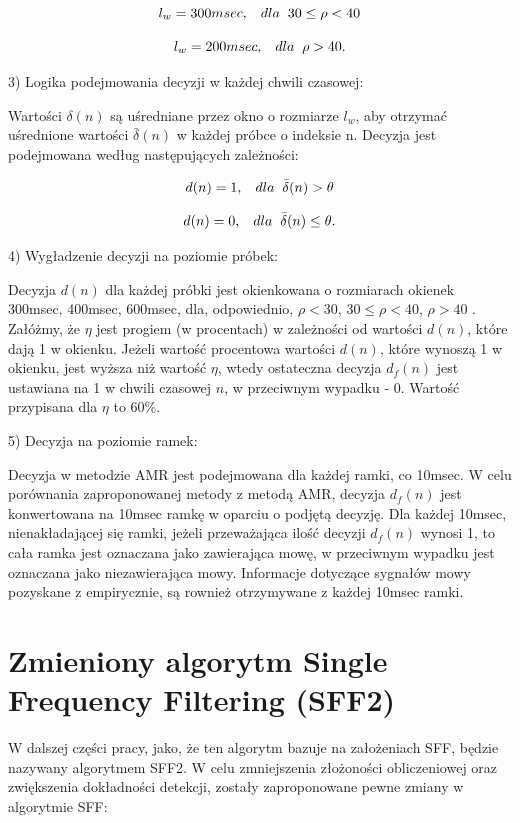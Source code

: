 \documentclass[eng,printmode]{mgr}
\begin{document}
  $$l_{w} = 300msec,\hspace{3mm}dla\hspace{2mm} 30\leq\rho<40 $$
  
  $$l_{w} = 200msec,\hspace{3mm}dla\hspace{2mm} \rho>40.$$\vspace{5mm}
  
  3) Logika podejmowania decyzji w każdej chwili czasowej:
  
  Wartości $\delta(n)$ są uśredniane przez okno o rozmiarze $l_{w}$, aby otrzymać uśrednione wartości $\bar{\delta}(n)$ w każdej próbce o indeksie n. Decyzja jest podejmowana według następujących zależności:
  
  $$d(n) = 1,\hspace{3mm}dla\hspace{2mm}\bar{\delta}(n)>\theta$$
  
  $$d(n) = 0,\hspace{3mm}dla\hspace{2mm}\bar{\delta}(n)\leq\theta.$$\vspace{5mm}
  
  4) Wygładzenie decyzji na poziomie próbek:
  
  Decyzja $d(n)$ dla każdej próbki jest okienkowana o rozmiarach okienek 300msec, 400msec, 600msec, dla, odpowiednio, $\rho<30$, $30\leq\rho<40$, $\rho>40$ . Załóżmy, że $\eta$ jest progiem (w procentach) w zależności od wartości $d(n)$, które dają 1 w okienku. Jeżeli wartość procentowa wartości $d(n)$, które wynoszą 1 w okienku, jest wyższa niż wartość $\eta$, wtedy ostateczna decyzja $d_f(n)$ jest ustawiana na 1 w chwili czasowej $n$, w przeciwnym wypadku - 0. Wartość przypisana dla $\eta$ to 60\%.\vspace{5mm}
  
  5) Decyzja na poziomie ramek:
  
  Decyzja w metodzie AMR jest podejmowana dla każdej ramki, co 10msec. W celu porównania zaproponowanej metody z metodą AMR, decyzja $d_{f}(n)$ jest konwertowana na 10msec ramkę w oparciu o podjętą decyzję. Dla każdej 10msec, nienakładającej się ramki, jeżeli przeważająca ilość decyzji $d_{f}(n)$ wynosi 1, to cała ramka jest oznaczana jako zawierająca mowę, w przeciwnym wypadku jest oznaczana jako niezawierająca mowy. Informacje dotyczące sygnałów mowy pozyskane z empirycznie, są rownież otrzymywane z każdej 10msec ramki.
  
  
 \newpage
 
\section{Zmieniony algorytm Single Frequency Filtering (SFF2)}
W dalszej części pracy, jako, że ten algorytm bazuje na założeniach SFF, będzie nazywany algorytmem SFF2.
W celu zmniejszenia złożoności obliczeniowej oraz zwiększenia dokładności detekcji, zostały zaproponowane pewne zmiany w algorytmie SFF:\vspace{5mm}
\end{document}
